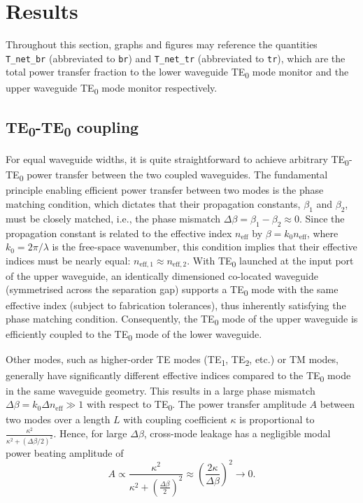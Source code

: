 \documentclass[10pt, a4paper]{article}
\begin{document}
\section{Results}

Throughout this section, graphs and figures may reference the quantities \texttt{T\_net\_br} (abbreviated to \texttt{br}) and \texttt{T\_net\_tr} (abbreviated to \texttt{tr}),
which are the total power transfer fraction to the lower waveguide TE\textsubscript{0} mode monitor and the upper waveguide TE\textsubscript{0} mode monitor respectively.

\subsection{TE\textsubscript{0}-TE\textsubscript{0} coupling}

For equal waveguide widths, it is quite straightforward to achieve arbitrary TE\textsubscript{0}-TE\textsubscript{0} power transfer between the two coupled waveguides.
The fundamental principle enabling efficient power transfer between two modes is the phase matching condition,
which dictates that their propagation constants, \(\beta_1\) and \(\beta_2\), must be closely matched, i.e., the phase mismatch \(\Delta\beta = \beta_1 - \beta_2 \approx 0\).
Since the propagation constant is related to the effective index \(n_\text{eff}\) by \(\beta = k_0 n_\text{eff}\), where \(k_0 = 2\pi/\lambda\) is the free-space wavenumber,
this condition implies that their effective indices must be nearly equal: \(n_{\text{eff},1} \approx n_{\text{eff},2}\).
With TE\textsubscript{0} launched at the input port of the upper waveguide, an identically dimensioned co-located waveguide (symmetrised across the separation gap) supports a TE\textsubscript{0} mode with the same effective index
(subject to fabrication tolerances), thus inherently satisfying the phase matching condition.
Consequently, the TE\textsubscript{0} mode of the upper waveguide is efficiently coupled to the TE\textsubscript{0} mode of the lower waveguide.

Other modes, such as higher-order TE modes (TE\textsubscript{1}, TE\textsubscript{2}, etc.) or TM modes, generally have significantly different effective indices compared to the TE\textsubscript{0} mode in the same waveguide geometry.
This results in a large phase mismatch \(\Delta\beta=k_0\Delta n_\text{eff}\gg 1\) with respect to TE\textsubscript{0}.
The power transfer amplitude \(A\) between two modes over a length \(L\) with coupling coefficient \(\kappa\) is proportional to \(\frac{\kappa^2}{\kappa^2 + {(\Delta\beta/2)}^2}\).
Hence, for large \(\Delta\beta\), cross-mode leakage has a negligible modal power beating amplitude of
\[A\propto\frac{\kappa^2}{\kappa^2+{(\frac{\Delta\beta}{2})}^2}\approx{\left(\frac{2\kappa}{\Delta\beta}\right)}^2\to 0.\]
\end{document}
